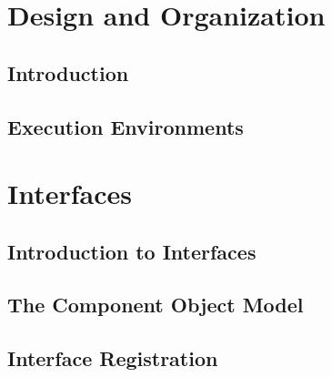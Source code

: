 %
% 
%
%


\newcommand{\libchap}[2]{\chapter{#1: \texttt{liboskit_#2.a}}
			 \ttindex{liboskit_#2.a}
			 \index{#2 library@{\texttt{#2} library}}}

\part{Design and Organization}
\label{design-org}

\chapter{Introduction}				
\chapter{Execution Environments}		


\part{Interfaces}
\label{intf}

\chapter{Introduction to \oskit{} Interfaces}	
\chapter{The Component Object Model}		
\chapter{Interface Registration}		
